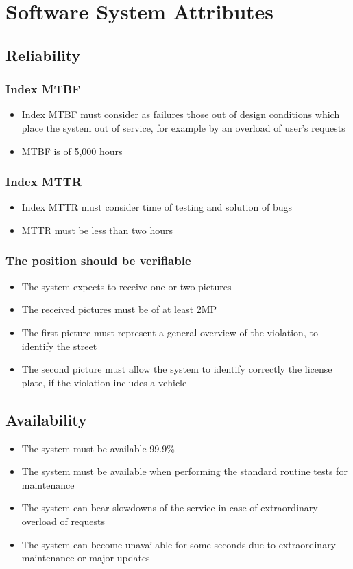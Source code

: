 \section{Software System Attributes}

\subsection{Reliability}
\subsubsection{Index MTBF}
\begin{itemize}
    \item Index MTBF must consider as failures those out of design conditions which place the system out of service, for example by an overload of user’s requests
    \item MTBF is of 5,000 hours
\end{itemize}

\subsubsection{Index MTTR}
\begin{itemize}
    \item Index MTTR must consider time of testing and solution of bugs
    \item MTTR must be less than two hours
\end{itemize}

\subsubsection{The position should be verifiable}
\begin{itemize}
    \item The system expects to receive one or two pictures
    \item The received pictures must be of at least 2MP
    \item The first picture must represent a general overview of the violation, to identify the street
    \item The second picture must allow the system to identify correctly the license plate, if the violation includes a vehicle
\end{itemize}

\subsection{Availability}
\begin{itemize}
    \item The system must be available 99.9\%
    \item The system must be available when performing the standard routine tests for maintenance
    \item The system can bear slowdowns of the service in case of extraordinary overload of requests
    \item The system can become unavailable for some seconds due to extraordinary maintenance or major updates
\end{itemize}


